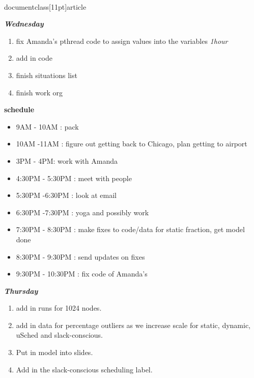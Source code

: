 \\documentclass[11pt]{article}
\newcommand{\timeEst}[1]{\textit{#1}}
\begin{document}
\textbf{\textit{Wednesday}}
\begin{enumerate}
\item fix Amanda's pthread code to assign values into the variables \timeEst{1hour}
\item add in code
\item finish situations list
\item finish work org
\end{enumerate}

\textbf{schedule}
\begin{itemize}
\item 9AM - 10AM :  pack
\item 10AM -11AM : figure out getting back to Chicago, plan getting to
airport
\item 3PM - 4PM: work with Amanda
\item 4:30PM - 5:30PM :  meet with people
\item 5:30PM -6:30PM :  look at email
\item 6:30PM -7:30PM :  yoga and possibly work
\item 7:30PM - 8:30PM : make fixes to code/data for static fraction,  get model done
\item 8:30PM - 9:30PM : send updates on fixes
\item 9:30PM - 10:30PM : fix code of Amanda's
\end{itemize}

\textbf{\textit{Thursday}}
\begin{enumerate}
\item add in runs for 1024 nodes.
\item add in data for percentage outliers as we increase scale for static, dynamic,
uSched and slack-conscious.
\item Put in model into slides.
\item Add in the slack-conscious scheduling label.
\end{enumerate}
\end{document}

